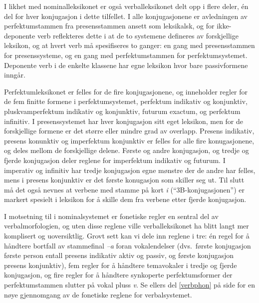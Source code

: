 \documentclass{article}
\let\w\emph
\begin{document}
I likhet med nominalleksikonet er ogs\aa{} verballeksikonet delt opp i flere
deler, \'en del for hver konjugasjon i dette tilfellet. I alle konjugasjonene
er avledningen av perfektumstammen fra presensstammen ansett som leksikalsk,
og for ikke-deponente verb reflekteres dette i at de to systemene defineres av
forskjellige leksikon, og at hvert verb m\aa{} spesifiseres to ganger: en gang
med presensstammen for presenssysteme, og en gang med perfektumstammen for
perfektumsystemet. Deponente verb i de enkelte klassene har egne leksikon hvor
bare passivformene inng\aa{}r.

Perfektumleksikonet er felles for de fire konjugasjonene, og inneholder regler
for de fem finitte formene i perfektumsystemet, perfektum indikativ og
konjunktiv, pluskvamperfektum indikativ og konjunktiv, futurum exactum, og
perfektum infinitiv. I presenssystemet har hver konjugasjon sitt eget
leksikon, men for de forskjellige formene er det st\o{}rre eller mindre grad
av overlapp. Presens indikativ, presens konunktiv og imperfektum konjunktiv er
felles for alle fire konugasjonene, og deles mellom de forskjellige delene.
F\o{}rste og andre konjugasjon, og tredje og fjerde konjugasjon deler reglene
for imperfektum indikativ og futurum. I imperativ og infinitiv har tredje
konjugasjon egne m\o{}nstre der de andre har felles, mens i presens konjunktiv
er det f\o{}rste konugasjon som skiller seg ut. Til slutt m\aa{} det ogs\aa{}
nevnes at verbene med stamme p\aa{} kort \w{i} (``3B-konjugasjonen'') er
markert spesielt i leksikon for \aa{} skille dem fra verbene etter fjerde
konjugasjon.

I motsetning til i nominalsystemet er fonetiske regler en sentral del av
verbalmorfologien, og uten disse reglene ville verballeksikonet ha blitt langt
mer komplisert og uoversiktlig. Grovt sett kan vi dele inn reglene i tre: \'en
regel for \aa{} h\aa{}ndtere bortfall av stammefinal \w{--a} foran
vokalendelser (dvs.~f\o{}rste konjugasjon f\o{}rste person entall presens
indikativ aktiv og passiv, og f\o{}rste konjugasjon presens konjunktiv), fem
regler for \aa{} h\aa{}ndtere temavokaler i tredje og fjerde konjugasjon, og
fire regler for \aa{} h\aa{}ndtere synkoperte perfektumsformer der
perfektumstammen slutter p\aa{} vokal pluss \w{v}. Se ellers del
\ref{verbphon} p\aa{} side \pageref{verbphon} for en n\o{}ye gjennomgang av de
fonetiske reglene for verbalsystemet.
\end{document}

